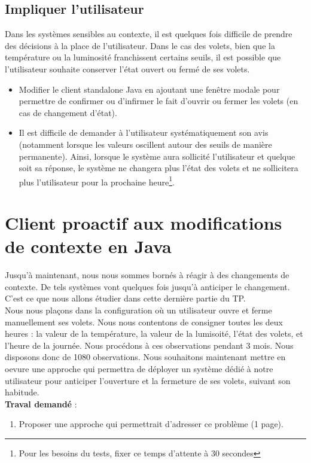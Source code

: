 \documentclass[a4paper,11pt,fleqn]{article}
\begin{document}
\subsection{Impliquer l'utilisateur}
Dans les systèmes sensibles au contexte, il est quelques fois difficile de prendre des décisions à la place de l'utilisateur. Dans le cas des volets, bien que la température ou la luminosité franchissent certains seuils, il est possible que l'utilisateur souhaite conserver l'état ouvert ou fermé de ses volets.\\

\begin{itemize}
 \item Modifier le client standalone Java en ajoutant une fenêtre modale pour permettre de confirmer ou d'infirmer le fait d'ouvrir ou fermer les volets (en cas de changement d'état).
 \item Il est difficile de demander à l'utilisateur systématiquement son avis (notamment lorsque les valeurs oscillent autour des seuils de manière permanente). Ainsi, lorsque le système aura sollicité l'utilisateur et quelque soit sa réponse, le système ne changera plus l'état des volets et ne sollicitera plus l'utilisateur pour la prochaine heure\footnote{Pour les besoins du tests, fixer ce temps d'attente à 30 secondes}.
\end{itemize}


\section{Client proactif aux modifications de contexte en Java}\label{sec:thinkharder}
Jusqu'à maintenant, nous nous sommes bornés à réagir à des changements de contexte. De tels systèmes vont quelques fois jusqu'à anticiper le changement. C'est ce que nous allons étudier dans cette dernière partie du TP.\\
Nous nous plaçons dans la configuration où un utilisateur ouvre et ferme manuellement ses volets. Nous nous contentons de consigner toutes les deux heures : la valeur de la température, la valeur de la lumisoité,  l'état des volets, et l'heure de la journée. Nous procédons à ces observations pendant 3 mois. Nous disposons donc de 1080 observations. Nous souhaitons maintenant mettre en oevure une approche qui permettra de déployer un système dédié à notre utilisateur pour anticiper l'ouverture et la fermeture de ses volets, suivant son habitude.\\

\textbf{Traval demandé} :
\begin{enumerate}
	\item Proposer une approche qui permettrait d'adresser ce problème (1 page).
\end{enumerate}
\end{document}
